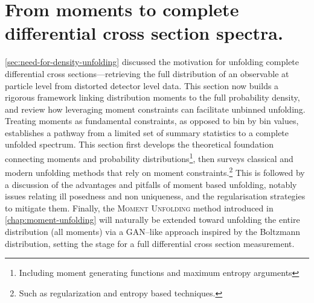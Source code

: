 {{\section{From moments to complete differential cross section spectra.}
    \cref{sec:need-for-density-unfolding} discussed the motivation for unfolding complete differential cross sections---retrieving the full distribution of an observable at particle level from distorted detector level data.
    This section now builds a rigorous framework linking distribution moments to the full probability density, and review how leveraging moment constraints can facilitate unbinned unfolding.
    Treating moments as fundamental constraints, as opposed to bin by bin values, establishes a pathway from a limited set of summary statistics to a complete unfolded spectrum.
    This section first develops the theoretical foundation connecting moments and probability distributions\footnote{Including moment generating functions and maximum entropy arguments}, then surveys classical and modern unfolding methods that rely on moment constraints.\footnote{Such as regularization and entropy based techniques.}
    This is followed by a discussion of the advantages and pitfalls of moment based unfolding, notably issues relating ill posedness and non uniqueness, and the regularisation strategies to mitigate them.
    Finally, the \textsc{Moment Unfolding} method introduced in \cref{chap:moment-unfolding} will naturally be extended toward unfolding the entire distribution (all moments) via a GAN--like approach inspired by the Boltzmann distribution, setting the stage for a full differential cross section measurement.

}}
